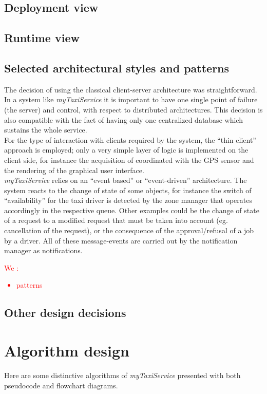 \documentclass[a4paper,11pt]{report} %
\newcommand{\mts}{\mbox{\normalfont\itshape myTaxiService}}
\begin{document}
	
	\subsection{Deployment view}
	
	\subsection{Runtime view}
	
	\subsection{Selected architectural styles and patterns}

	The decision of using the classical client-server architecture was straightforward. In a system like \mts{} it is important to have one single point of failure (the server) and control, with respect to distributed architectures. This decision is also compatible with the fact of having only one centralized database which sustains the whole service.\\
	For the type of interaction with clients required by the system, the ``thin client'' approach is employed; only a very simple layer of logic is implemented on the client side, for instance the acquisition of coordinated with the GPS sensor and the rendering of the graphical user interface.\\
	\mts{} relies on an ``event based'' or ``event-driven'' architecture. The system reacts to the change of state of some objects, for instance the switch of ``availability'' for the taxi driver is detected by the zone manager that operates accordingly in the respective queue. Other examples could be the change of state of a request to a modified request that must be taken into account (eg. cancellation of the request), or the consequence of the approval/refusal of a job by a driver. All of these message-events are carried out by the notification manager as notifications.\\
	\textcolor{red}{We :\begin{itemize}
			\item patterns
		\end{itemize}}	
	
	\subsection{Other design decisions}

	\section{Algorithm design}
	Here are some distinctive algorithms of \mts{} presented with both pseudocode and flowchart diagrams.
\end{document}
